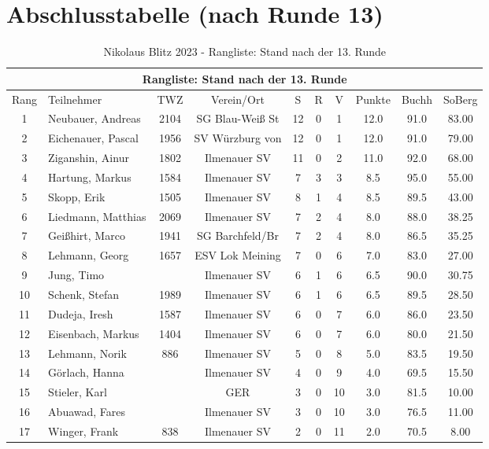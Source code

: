 \documentclass[a4paper,ngerman]{tui-algo-seminar}
\begin{document}
\section{Abschlusstabelle (nach Runde 13)}
\begin{table}[h]
    \centering
    \caption{Nikolaus Blitz 2023 - Rangliste: Stand nach der 13. Runde}
    \begin{tabular}{|c|l|c|c|c|c|c|c|c|c|}
        \hline
        \multicolumn{10}{|c|}{Rangliste: Stand nach der 13. Runde} \\
        \hline
        Rang & Teilnehmer & TWZ & Verein/Ort & S & R & V & Punkte & Buchh & SoBerg \\
        \hline
        1 & Neubauer, Andreas & 2104 & SG Blau-Weiß St & 12 & 0 & 1 & 12.0 & 91.0 & 83.00 \\
        2 & Eichenauer, Pascal & 1956 & SV Würzburg von & 12 & 0 & 1 & 12.0 & 91.0 & 79.00 \\
        3 & Ziganshin, Ainur & 1802 & Ilmenauer SV & 11 & 0 & 2 & 11.0 & 92.0 & 68.00 \\
        4 & Hartung, Markus & 1584 & Ilmenauer SV & 7 & 3 & 3 & 8.5 & 95.0 & 55.00 \\
        5 & Skopp, Erik & 1505 & Ilmenauer SV & 8 & 1 & 4 & 8.5 & 89.5 & 43.00 \\
        6 & Liedmann, Matthias & 2069 & Ilmenauer SV & 7 & 2 & 4 & 8.0 & 88.0 & 38.25 \\
        7 & Geißhirt, Marco & 1941 & SG Barchfeld/Br & 7 & 2 & 4 & 8.0 & 86.5 & 35.25 \\
        8 & Lehmann, Georg & 1657 & ESV Lok Meining & 7 & 0 & 6 & 7.0 & 83.0 & 27.00 \\
        9 & Jung, Timo & & Ilmenauer SV & 6 & 1 & 6 & 6.5 & 90.0 & 30.75 \\
        10 & Schenk, Stefan & 1989 & Ilmenauer SV & 6 & 1 & 6 & 6.5 & 89.5 & 28.50 \\
        11 & Dudeja, Iresh & 1587 & Ilmenauer SV & 6 & 0 & 7 & 6.0 & 86.0 & 23.50 \\
        12 & Eisenbach, Markus & 1404 & Ilmenauer SV & 6 & 0 & 7 & 6.0 & 80.0 & 21.50 \\
        13 & Lehmann, Norik & 886 & Ilmenauer SV & 5 & 0 & 8 & 5.0 & 83.5 & 19.50 \\
        14 & Görlach, Hanna & & Ilmenauer SV & 4 & 0 & 9 & 4.0 & 69.5 & 15.50 \\
        15 & Stieler, Karl & & GER & 3 & 0 & 10 & 3.0 & 81.5 & 10.00 \\
        16 & Abuawad, Fares & & Ilmenauer SV & 3 & 0 & 10 & 3.0 & 76.5 & 11.00 \\
        17 & Winger, Frank & 838 & Ilmenauer SV & 2 & 0 & 11 & 2.0 & 70.5 & 8.00 \\
        \hline
    \end{tabular}
\end{table}
\end{document}
